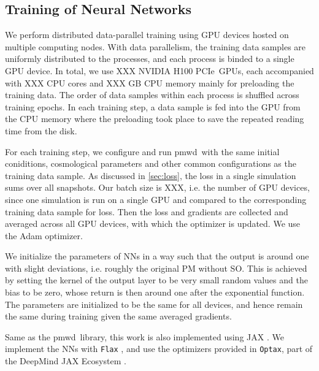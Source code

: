 \documentclass[modern, trackchanges, dvipsnames]{aastex631}
\newcommand{\pmwd}{{\usefont{T1}{nova}{m}{sl}pmwd}}
\newcommand{\GPU}{NVIDIA H100 PCIe}  %
\begin{document}
\subsection{Training of Neural Networks}

We perform distributed data-parallel training using GPU devices hosted
on multiple computing nodes.
With data parallelism, the training data samples are uniformly
distributed to the processes, and each process is binded to a single GPU
device.
In total, we use XXX \GPU\ GPUs, each accompanied with XXX CPU cores
and XXX GB CPU memory mainly for preloading the training data.
The order of data samples within each process is shuffled across
training epochs.
In each training step, a data sample is fed into the GPU from the CPU
memory where the preloading took place to save the repeated reading time
from the disk.

For each training step, we configure and run \pmwd\ with the same
initial coniditions, cosmological parameters and other common
configurations as the training data sample.
As discussed in \autoref{sec:loss}, the loss in a single simulation sums
over all snapshots.
Our batch size is XXX, i.e. the number of GPU devices, since one
simulation is run on a single GPU and compared to the corresponding
training data sample for loss.
Then the loss and gradients are collected and averaged across all GPU
devices, with which the optimizer is updated.
We use the Adam \citep{Adam} optimizer.

We initialize the parameters of NNs in a way such that the output is
around one with slight deviations, i.e. roughly the original PM without
SO.
This is achieved by setting the kernel of the output layer to be very
small random values and the bias to be zero, whose return is then around
one after the exponential function.
The parameters are initialized to be the same for all devices, and hence
remain the same during training given the same averaged gradients.



Same as the \pmwd\ library, this work is also implemented using JAX
\citep{JAX}.
We implement the NNs with \texttt{Flax} \citep{flax2020github}, and use
the optimizers provided in \texttt{Optax}, part of the DeepMind JAX
Ecosystem \citep{deepmind2020jax}.
\end{document}
